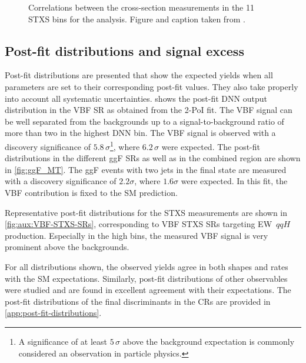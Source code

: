 \begin{figure}[htb]
  \centering
  \scalebox{0.8}{
    
  }
  \caption{
    Correlations between the cross-section measurements in the 11 STXS bins for the \hwwenmn analysis.
    Figure and caption taken from .
    \label{fig:STXS-correlation}
  }
\end{figure}

\subsection{Post-fit distributions and signal excess}
Post-fit distributions are presented that show the expected yields when all parameters are set to their corresponding post-fit values. They also take properly into account all systematic uncertainties.  shows the post-fit DNN output distribution in the VBF SR as obtained from the 2-PoI fit.
The VBF signal can be well separated from the backgrounds up to a signal-to-background ratio of more than two in the highest DNN bin. 
The VBF signal is observed with a discovery significance of $5.8\,\sigma$\footnote{A significance of at least $5\,\sigma$ above the background expectation is commonly considered an observation in particle physics.}, where $6.2\,\sigma$ were expected.
The post-fit \mT distributions in the different ggF SRs as well as in the combined region are shown in \cref{fig:ggF_MT}.
The ggF events with two jets in the final state are measured with a discovery significance of $2.2\sigma$, where $1.6\sigma$ were expected. In this fit, the VBF contribution is fixed to the SM prediction.

Representative post-fit distributions for the STXS measurements are shown in \cref{fig:aux:VBF-STXS-SRs}, corresponding to VBF STXS SRs targeting EW~$qqH$ production. 
Especially in the high \mjj bins, the measured VBF signal is very prominent above the backgrounds. 

For all distributions shown, the observed yields agree in both shapes and rates with the SM expectations.
Similarly, post-fit distributions of other observables were studied and are found in excellent agreement with their expectations. The post-fit distributions of the final discriminants in the CRs are provided in \cref{app:post-fit-distributions}. 

